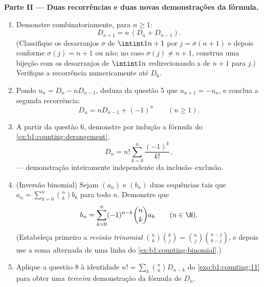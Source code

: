 \begin{problem}
\medskip
\noindent\textbf{Parte II --- Duas recorrências e duas novas
demonstrações da fórmula.}
\begin{enumerate}
  \item Demonstre combinatoriamente, para $n \geq 1$:
        \[
        D_{n+1} = n\,(D_n + D_{n-1}) .
        \]
        (Classifique os desarranjos $\sigma$ de $\intint1{n+1}$ por
        $j = \sigma(n+1)$ e depois conforme $\sigma(j) = n + 1$ ou não; no
        caso $\sigma(j) \neq n+1$, construa uma bijeção com os
        desarranjos de $\intint1n$ redirecionando a  de
        $n + 1$ para $j$.) Verifique a recorrência numericamente até
        $D_6$.
  \item Pondo $u_n = D_n - n D_{n-1}$, deduza da questão 5
        que $u_{n+1} = -u_n$, e conclua a segunda recorrência:
        \[
        D_n = n D_{n-1} + (-1)^n \qquad (n \geq 1).
        \]
  \item A partir da questão 6, demonstre por indução a fórmula do
        \cref{ex:b1:counting:derangement},
        \[
        D_n = n! \sum_{k=0}^{n} \frac{(-1)^k}{k!},
        \]
        --- demonstração inteiramente independente da
        inclusão--exclusão.
  \item (Inversão binomial) Sejam $(a_n)$ e $(b_n)$ duas
        sequências tais que $a_n = \sum_{k=0}^n \binom nk b_k$ para
        todo $n$. Demonstre que
        \[
        b_n = \sum_{k=0}^{n} (-1)^{n-k} \binom nk a_k
        \qquad (n \in \N).
        \]
        (Estabeleça primeiro a \emph{revisão trinomial}
        $\binom nk \binom kj = \binom nj \binom{n-j}{k-j}$, e depois
        use a soma alternada de uma linha do
        \cref{ex:b1:counting:binomial}.)
  \item Aplique a questão 8 à identidade $n! = \sum_k \binom nk
        D_{n-k}$ do \cref{exo:b1:counting:11} para obter uma
        \emph{terceira} demonstração da fórmula de $D_n$.
\end{enumerate}


\end{problem}
